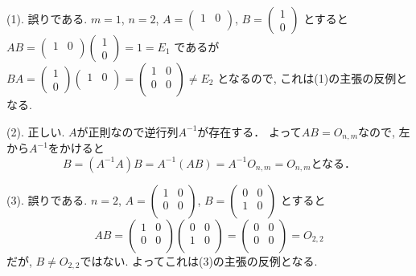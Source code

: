 \documentclass[dvipdfmx,a4paper,11pt]{article}
\theoremstyle{definition}
\begin{document}
(1). 誤りである. $m=1$, $n=2$, 
$
A =  \begin{pmatrix}
1& 0 \\
 \end{pmatrix} 
$, 
$
B =  \begin{pmatrix}
1\\
 0 
 \end{pmatrix} 
$
とすると
$
AB =  \begin{pmatrix}
1& 0 \\
 \end{pmatrix} 
 \begin{pmatrix}
1\\
 0 
 \end{pmatrix} 
 = 1 = E_1
$
であるが
$
BA =  
 \begin{pmatrix}
1\\
 0 
 \end{pmatrix} 
\begin{pmatrix}
1& 0 \\
 \end{pmatrix} 
 = 
 \begin{pmatrix}
1& 0 \\
0& 0 \\
 \end{pmatrix} 
 \neq  E_2
$
となるので, これは(1)の主張の反例となる.

(2). 正しい. $A$が正則なので逆行列$A^{-1}$が存在する．
よって$AB = O_{n,m}$なので, 左から$A^{-1}$をかけると
$$
B = (A^{-1} A) B = A^{-1} (AB) = A^{-1} O_{n,m} = O_{n,m}
\text{となる．}
$$

(3). 誤りである.
$n=2$, 
$
A =  \begin{pmatrix}
1& 0 \\
0& 0 \\
 \end{pmatrix} 
$, 
$
B =  \begin{pmatrix}
0& 0 \\
1& 0 \\
 \end{pmatrix} 
$
とすると
$$
AB =
\begin{pmatrix}
1& 0 \\
0& 0 \\
 \end{pmatrix} 
 \begin{pmatrix}
0& 0 \\
1& 0 \\
 \end{pmatrix} 
 =
 \begin{pmatrix}
0& 0 \\
0& 0 \\
 \end{pmatrix} 
 = O_{2,2}
$$
だが, $B \neq O_{2,2}$ではない. よってこれは(3)の主張の反例となる.
\end{document}

